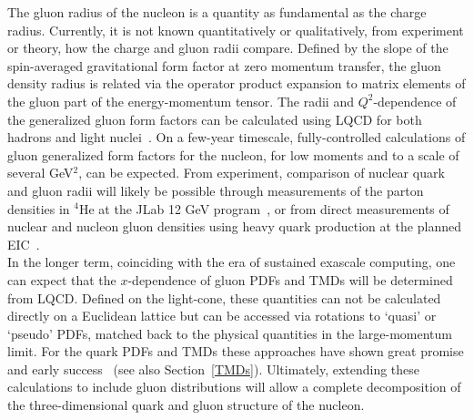 The gluon radius of the nucleon is a quantity as fundamental as the charge radius. Currently, it is not known quantitatively or qualitatively, from experiment or theory, how the charge and gluon radii compare. 
Defined by the slope of the spin-averaged gravitational form factor at zero momentum transfer, the gluon density radius is related via the operator product expansion to matrix elements of the gluon part of the energy-momentum tensor.
The radii and $Q^2$-dependence of the generalized gluon form factors can be calculated using LQCD for both hadrons and light nuclei~\cite{Detmold:2017oqb,Winter:2017bfs}.
On a few-year timescale, fully-controlled calculations of gluon generalized form factors for the nucleon, for low moments and to a scale of several GeV$^2$, can be expected.
From experiment, comparison of nuclear quark and gluon radii will likely be possible through measurements of the parton densities in ${}^4$He at the JLab 12 GeV program~\cite{Hattawy:2017woc}, or from direct measurements of nuclear and nucleon gluon densities using heavy quark production at the planned EIC~\cite{Chudakov:2016otl}. \\

In the longer term, coinciding with the era of sustained exascale computing, one can expect that the $x$-dependence of gluon PDFs and TMDs will be determined from LQCD. Defined on the light-cone, these quantities can not be calculated directly on a Euclidean lattice but can be accessed via rotations to `quasi' or `pseudo' PDFs, matched back to the physical quantities in the large-momentum limit. For the quark PDFs and TMDs these approaches have shown great promise and early success~\cite{Lin:2014zya,Alexandrou:2015rja} (see also Section~\ref{TMDs}). Ultimately, extending these calculations to include gluon distributions will allow a complete decomposition of the three-dimensional quark and gluon structure of the nucleon. 

